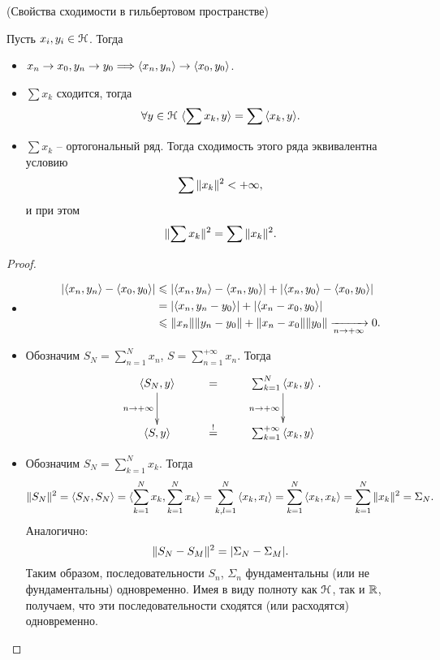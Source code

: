 \begin{theorem}(Свойства сходимости в гильбертовом пространстве) 

    \label{th:pytha} Пусть $x_i, y_i \in \mathcal{H}$. Тогда
    \begin{itemize}
        \item $x_n \to x_0, y_n \to y_0 \Longrightarrow \langle x_n, y_n \rangle \to \langle x_0, y_0 \rangle$.
        \item $\sum{x_k}$ сходится, тогда
            \[
                \forall y \in \mathcal{H}~ \langle \sum{x_k}, y \rangle = \sum{\langle x_k, y \rangle}
            .\]
        \item $\sum{x_k}$ -- ортогональный ряд. Тогда сходимость этого ряда
            эквивалентна условию
            \[
                \sum{\lVert x_k\rVert^2} < +\infty
            ,\]
            и при этом
            \[
                \lVert\sum{x_k}\rVert^2 = \sum{\lVert x_k\rVert^2}
            .\]
    \end{itemize}
\end{theorem}
\begin{proof}
    \enewline
    \begin{itemize}
        \item 
            \begin{align*}
                |\langle x_n, y_n \rangle - \langle x_0, y_0 \rangle| 
                &\leqslant |\langle x_n, y_n \rangle - \langle x_n, y_0 \rangle| + 
                |\langle x_n, y_0 \rangle - \langle x_0, y_0 \rangle| \\
                &= |\langle x_n, y_n - y_0 \rangle| + |\langle x_n - x_0, y_0 \rangle| \\
                &\leqslant \lVert x_n\rVert \lVert y_n - y_0\rVert + \lVert x_n - x_0\rVert \lVert y_0\rVert
                \xrightarrow[n \to +\infty]{} 0
            .\end{align*}
        \item Обозначим $S_N = \sum_{n = 1}^N{x_n}$, $S = \sum_{n = 1}^{+\infty}{x_n}$.
            Тогда
            \[
                \xymatrix{
                    \scp{S_N}{y} \ar[d]_{n \to +\infty} & = & \sum_{k = 1}^N
                                                        {\scp{x_k}{y}} \ar[d]_{n \to +\infty} \\
                    \scp{S}{y} & \overset{!}{=} & \sum_{k = 1}^{+\infty}{\scp{x_k}{y}}
                }
            .\]
        \item Обозначим $S_N = \sum_{k = 1}^N{x_k}$. Тогда
            \begin{align*}
                \lVert S_N\rVert^2 = \langle S_N, S_N \rangle = \langle \sum_{k = 1}^N{x_k}, \sum_{k = 1}^N{x_k} \rangle =
                \sum_{k, l = 1}^N{\langle x_k, x_l \rangle} = \sum_{k = 1}^N{\langle x_k, x_k \rangle} = 
                \sum_{k = 1}^N{\lVert x_k\rVert^2} = \Sigma_N
            .\end{align*}
            Аналогично:
            \[
                \lVert S_N - S_M\rVert^2 = |\Sigma_N - \Sigma_M|
            .\]
            Таким образом, последовательности $S_n$, $\Sigma_n$ фундаментальны
            (или не фундаментальны) одновременно. Имея в виду полноту как $\mathcal{H}$,
            так и $\mathbb{R}$, получаем, что эти последовательности сходятся (или
            расходятся) одновременно.
    \end{itemize}
\end{proof}

